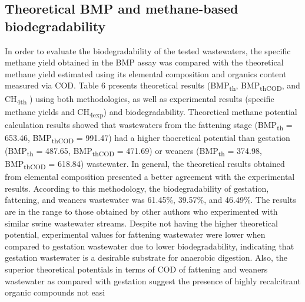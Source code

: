 \subsection{Theoretical BMP and methane-based biodegradability}
In order to evaluate the biodegradability of the tested wastewaters, the specific methane yield obtained in the BMP assay was compared with the theoretical methane yield estimated using its elemental composition and organics content measured via COD. Table 6 presents theoretical results (BMP\textsubscript{th}, BMP\textsubscript{thCOD}, and CH\textsubscript{4th} ) using both methodologies, as well as experimental results (specific methane yields and CH\textsubscript{4exp}) and  biodegradability.  Theoretical methane potential calculation results showed that wastewaters from the fattening stage (BMP\textsubscript{th} = 653.46, BMP\textsubscript{thCOD} = 991.47) had a higher thoeretical potential than gestation (BMP\textsubscript{th} = 487.65, BMP\textsubscript{thCOD} = 471.69) or weaners (BMP\textsubscript{th} = 374.98, BMP\textsubscript{thCOD} = 618.84) wastewater. In general, the theoretical results obtained from elemental composition presented a better agreement with the experimental results. According to this methodology, the biodegradability of gestation, fattening, and weaners wastewater was 61.45\%, 39.57\%, and 46.49\%. The results are in the range to those obtained by other authors \cite{Zhang_2014} who experimented with similar swine wastewater streams. Despite not having the higher theoretical potential, experimental values for fattening wastewater were lower when compared to gestation wastewater due to lower biodegradability, indicating that gestation wastewater is a desirable substrate for anaerobic digestion. Also, the superior theoretical potentials in terms of COD of fattening and weaners wastewater as compared with gestation suggest the presence of highly recalcitrant organic compounds not easi 